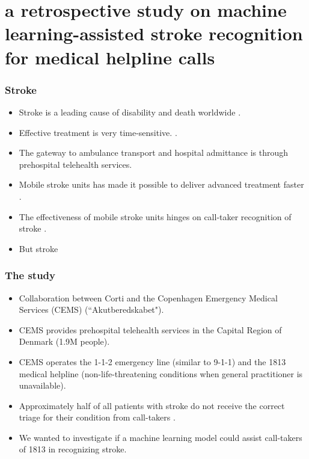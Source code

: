 
\section[A Retrospective Study on Machine Learning-Assisted Stroke Recognition for Medical Helpline Calls]{a retrospective study on machine learning-assisted stroke recognition\\ for medical helpline calls}


\begin{frame}
    \frametitle{Stroke}
    \begin{itemize}
        \item Stroke is a leading cause of {\color{dtured}disability and death} worldwide \parencite{cite1,cite2,cite3}.
        \item Effective treatment is very {\color{dtured}time-sensitive}. \parencite{cite4,cite5}.
        \item The gateway to {\color{dtured}ambulance transport and hospital admittance} is through {\color{dtured}prehospital telehealth services}.
        \item {\color{dtured}Mobile stroke units} has made it possible to deliver advanced treatment faster \parencite{cite6,cite7}.
        \item The effectiveness of mobile stroke units hinges on {\color{dtured}call-taker recognition of stroke} \parencite{cite6,cite7}.
        \item But stroke 
    \end{itemize}
\end{frame}


\begin{frame}
    \frametitle{The study}
    \begin{itemize}
        \item Collaboration between {\color{dtured}Corti} and the {\color{dtured}Copenhagen Emergency Medical Services (CEMS)} (``Akutberedskabet").
        \item CEMS provides prehospital telehealth services in the Capital Region of Denmark (1.9M people).
        \item CEMS operates the 1-1-2 emergency line (similar to 9-1-1) and the 1813 medical helpline (non-life-threatening conditions when general practitioner is unavailable).
        \item Approximately half of all patients with stroke do not receive the correct triage for their condition from call-takers \parencite{cite10,cite11,cite12}. 
        \vspace{1em}
        \item We wanted to investigate if a machine learning model could assist call-takers of 1813 in recognizing stroke.
    \end{itemize}
\end{frame}


